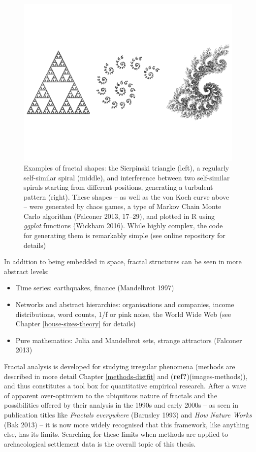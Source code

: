 \documentclass[
  12pt,
  a4paper, twoside]{book}
\begin{document}
\begin{figure}

{\centering \includegraphics[width=0.9\linewidth]{bookdown-demo_files/figure-latex/02-fractals-1} 

}

\caption[Examples of fractal shapes]{Examples of fractal shapes: the Sierpinski triangle (left), a regularly self-similar spiral (middle), and interference between two self-similar spirals starting from different positions, generating a turbulent pattern (right). These shapes -- as well as the von Koch curve above -- were generated by chaos games, a type of Markov Chain Monte Carlo algorithm (Falconer 2013, 17--29), and plotted in R using \emph{ggplot} functions (Wickham 2016). While highly complex, the code for generating them is remarkably simple (see online repository for details)}\label{fig:02-fractals}
\end{figure}

In addition to being embedded in space, fractal structures can be seen in more abstract levels:

\begin{itemize}
\item
  Time series: earthquakes, finance (Mandelbrot 1997)
\item
  Networks and abstract hierarchies: organisations and companies, income distributions, word counts, 1/f or pink noise, the World Wide Web (see Chapter \ref{house-sizes-theory} for details)
\item
  Pure mathematics: Julia and Mandelbrot sets, strange attractors (Falconer 2013)
\end{itemize}

Fractal analysis is developed for studying irregular phenomena (methods are described in more detail Chapter \ref{methods-distfit} and (\textbf{ref?})(images-methods)), and thus constitutes a tool box for quantitative empirical research. After a wave of apparent over-optimism to the ubiquitous nature of fractals and the possibilities offered by their analysis in the 1990s and early 2000s -- as seen in publication titles like \emph{Fractals everywhere} (Barnsley 1993) and \emph{How Nature Works} (Bak 2013) -- it is now more widely recognised that this framework, like anything else, has its limits. Searching for these limits when methods are applied to archaeological settlement data is the overall topic of this thesis.
\end{document}

